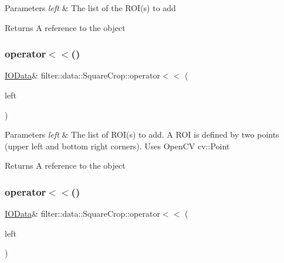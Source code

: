 \begin{DoxyParams}{Parameters}
{\em left} & The list of the R\+O\+I(s) to add \\
\hline
\end{DoxyParams}
\begin{DoxyReturn}{Returns}
A reference to the object 
\end{DoxyReturn}
\mbox{\label{classfilter_1_1data_1_1_square_crop_a648729bc989b528bad91ea86154ceee7}} 
\subsubsection{\texorpdfstring{operator$<$$<$()}{operator<<()}\hspace{0.1cm}{\footnotesize\ttfamily [3/5]}}
{\footnotesize\ttfamily \hyperlink{classfilter_1_1data_1_1_i_o_data}{I\+O\+Data}\& filter\+::data\+::\+Square\+Crop\+::operator$<$$<$ (\begin{DoxyParamCaption}\item[{const std\+::vector$<$ cv\+::\+Point $>$ \&}]{left }\end{DoxyParamCaption})\hspace{0.3cm}{\ttfamily [inline]}}


\begin{DoxyParams}{Parameters}
{\em left} & The list of R\+O\+I(s) to add. A R\+OI is defined by two points (upper left and bottom right corners). Uses Open\+CV cv\+::\+Point \\
\hline
\end{DoxyParams}
\begin{DoxyReturn}{Returns}
A reference to the object 
\end{DoxyReturn}
\mbox{\label{classfilter_1_1data_1_1_square_crop_abbe28f7fc483ae4ceec244cf9d4da4dc}} 
\subsubsection{\texorpdfstring{operator$<$$<$()}{operator<<()}\hspace{0.1cm}{\footnotesize\ttfamily [4/5]}}
{\footnotesize\ttfamily \hyperlink{classfilter_1_1data_1_1_i_o_data}{I\+O\+Data}\& filter\+::data\+::\+Square\+Crop\+::operator$<$$<$ (\begin{DoxyParamCaption}\item[{const \hyperlink{classfilter_1_1data_1_1_image_data}{Image\+Data} \&}]{left }\end{DoxyParamCaption})\hspace{0.3cm}{\ttfamily [inline]}}


